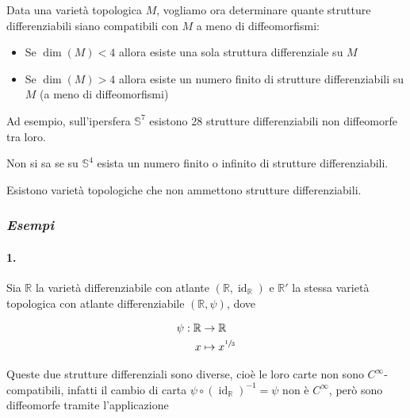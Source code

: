 Data una varietà topologica $ M $, vogliamo ora determinare quante strutture differenziabili siano compatibili con $ M $ a meno di diffeomorfismi:

\begin{itemize}
	\item Se $ \dim(M) < 4 $ allora esiste una sola struttura differenziale su $ M $
	
	\item Se $ \dim(M) > 4 $ allora esiste un numero finito di strutture differenziabili su $ M $ (a meno di diffeomorfismi)
\end{itemize}

Ad esempio, sull'ipersfera $ \mathbb{S}^{7} $ esistono 28 strutture differenziabili non diffeomorfe tra loro.

\begin{remark}
	Non si sa se su $ \mathbb{S}^{4} $ esista un numero finito o infinito di strutture differenziabili.
\end{remark}

\begin{remark}
	Esistono varietà topologiche che non ammettono strutture differenziabili.
\end{remark}

\subsubsection{\textit{Esempi}}

\paragraph{1.}

Sia $ \mathbb{R} $ la varietà differenziabile con atlante $ (\mathbb{R},\operatorname{id}_{\mathbb{R}}) $ e $ \mathbb{R}' $ la stessa varietà topologica con atlante differenziabile $ (\mathbb{R},\psi) $, dove

\begin{align}
	\begin{split}
		\psi : \mathbb{R} &\to \mathbb{R}\\
		x &\mapsto x^{\sfrac{1}{3}}
	\end{split}	
\end{align}

Queste due strutture differenziali sono diverse, cioè le loro carte non sono $ C^{\infty} $-compatibili, infatti il cambio di carta $ \psi \circ (\operatorname{id}_{\mathbb{R}})^{-1} = \psi $ non è $ C^{\infty} $, però sono diffeomorfe tramite l'applicazione


